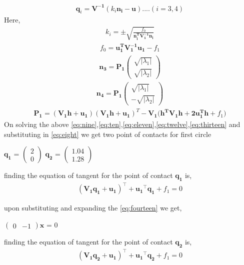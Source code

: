 \documentclass[journal,12pt,twocolumn]{IEEEtran}
\newcommand{\myvec}[1]{\ensuremath{\begin{pmatrix}#1\end{pmatrix}}}
\let\vec\mathbf
\begin{document}
\begin{align}
\label{eq:eight}
\boxed{\vec{q}_i = \vec{V^{-1}}(k_i\vec{n_i-u})}....(i = 3,4) 
\end{align}
Here, 
\begin{align}
\label{eq:nine}
k_i = \pm\sqrt{\frac{f_0}{\vec{n_i^TV_1^{-1}n_i}}}
\end{align}
\begin{align}
\label{eq:ten}
f_0 = \vec{u_1^TV_1^{-1}u_1}-f_1
\end{align}
\begin{align}
\label{eq:eleven}
\vec{n_3} = \vec{P_1}\myvec{\sqrt{|\lambda_1|} \\ \sqrt{|\lambda_2|}}
\end{align}
\begin{align}
\label{eq:twelve}
\vec{n_4} = \vec{P_1}\myvec{\sqrt{|\lambda_1|} \\ -\sqrt{|\lambda_2|}}
\end{align}
\begin{align}
\label{eq:thirteen}
\vec{P_1} = (\vec{V_1h+u_1})(\vec{V_1h+u_1})^T-\vec{V_1(h^TV_1h+2u_1^Th}+f_1)
\end{align}
On solving the above \eqref{eq:nine},\eqref{eq:ten},\eqref{eq:eleven},\eqref{eq:twelve},\eqref{eq:thirteen} and substituting in \eqref{eq:eight} we get two point of contacts for first circle \\

\begin{center}
$\vec{q_1}$ = $\myvec{2 \\ 0}$
$\vec{q_2}$ = $\myvec{1.04 \\ 1.28}$ 
\end{center}

finding the equation of tangent for the point of contact $\vec{q_1}$ is,
\begin{align}
\label{eq:fourteen}
(\vec{V_1}\vec{q_1}+\vec{u_1})^{\top}+\vec{u_1}^{\top}\vec{q_1} + f_1 = 0
\end{align} 

upon substituting and expanding the \eqref{eq:fourteen} we get,
\begin{center}
$\myvec{0 & -1}\vec{x}$ = 0 
\end{center}

finding the equation of tangent for the point of contact $\vec{q_2}$ is,
\begin{align}
\label{eq:fifteen}
(\vec{V_1}\vec{q_2}+\vec{u_1})^{\top}+\vec{u_1}^{\top}\vec{q_2} + f_1 = 0 
\end{align}
\end{document}
